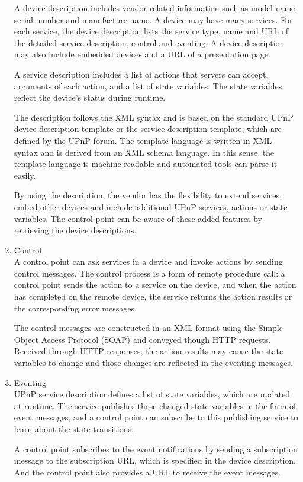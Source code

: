 \begin{enumerate}
A device description includes vendor related information such as model name, serial number and 
manufacture name. A device may have many services. For each service, the device description lists 
the service type, name and URL of the detailed service description, control and eventing. A device 
description may also include embedded devices and a URL of a presentation page. 

A service description includes a list of actions that servers can accept, arguments of each action, 
and a list of state variables. The state variables reflect the device's status during runtime. 

The description follows the XML syntax and is based on the standard UPnP device description template or the service description template, which are defined by the UPnP forum. The template language is written in XML syntax and is derived from an XML schema language. In this sense, the template language is machine-readable and automated tools can parse it easily. 

By using the description, the vendor has the flexibility to extend services, embed other devices and include 
additional UPnP services, actions or state variables. The control point can be aware of these added features by retrieving the device descriptions. 
\item Control \\ 
A control point can ask services in a device and invoke actions by sending control messages. The control process is a form of remote procedure call: a control point sends the action to a service on the device, and when the action has completed on the remote device, the service returns the action results or the corresponding error messages. 

The control messages are constructed in an XML format using the Simple Object Access Protocol (SOAP) and conveyed though HTTP requests. Received through HTTP responses, the action results may cause the state variables to change and those changes are reflected in the eventing messages. 
\item Eventing \\ 
UPnP service description defines a list of state variables, which are updated at runtime. The service 
publishes those changed state variables in the form of event messages, and a control point can 
subscribe to this publishing service to learn about the state transitions. 

A control point subscribes to the event notifications by sending a subscription message to the 
subscription URL, which is specified in the device description. And the control point also provides a URL to receive the event messages. 


\end{enumerate}
